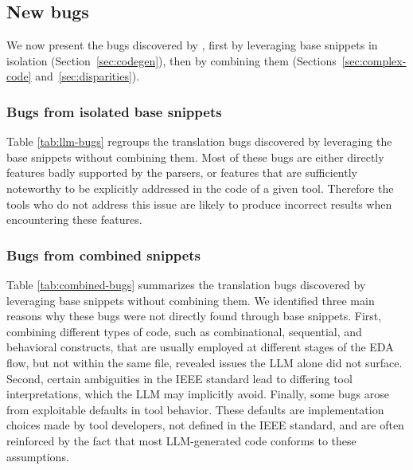 

\subsection{New bugs}
\label{sec:eval:newbugs}

We now present the bugs discovered by \ourname, first by leveraging base snippets in isolation (Section~\ref{sec:codegen}), then by combining them (Sections~\ref{sec:complex-code} and~\ref{sec:disparities}).

\subsubsection{Bugs from isolated base snippets}
\label{sec:eval:basesnippetbugs}

Table \ref{tab:llm-bugs} regroups the translation bugs discovered by leveraging the base snippets without combining them.
Most of these bugs are either directly features badly supported by the parsers,
or features that are sufficiently noteworthy to be explicitly addressed in the code of a given tool.
Therefore the tools who do not address this issue are likely to produce incorrect results when encountering these features.

\subsubsection{Bugs from combined snippets}
\label{sec:eval:basesnippetbugs}

Table \ref{tab:combined-bugs} summarizes the translation bugs discovered by leveraging base snippets without combining them. We identified three main reasons why these bugs were not directly found through base snippets. First, combining different types of code, such as combinational, sequential, and behavioral constructs, that are usually employed at different stages of the EDA flow, but not within the same file, revealed issues the LLM alone did not surface. Second, certain ambiguities in the IEEE standard lead to differing tool interpretations, which the LLM may implicitly avoid. Finally, some bugs arose from exploitable defaults in tool behavior. These defaults are implementation choices made by tool developers, not defined in the IEEE standard, and are often reinforced by the fact that most LLM-generated code conforms to these assumptions.

